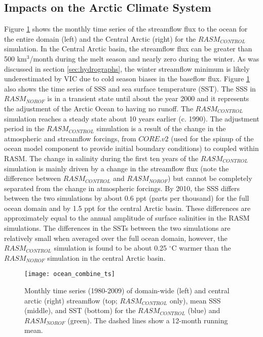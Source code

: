 \subsection{Impacts on the Arctic Climate System}
\label{sec:ocean}
Figure \ref{fig:ocean_timeseries} shows the monthly time series of the streamflow flux to the ocean for the entire domain (left) and the Central Arctic (right) for the $RASM_{CONTROL}$ simulation.
In the Central Arctic basin, the streamflow flux can be greater than 500 km$^3$/month during the melt season and nearly zero during the winter.
As was discussed in section \ref{sec:hydrographs}, the winter streamflow minimum is likely underestimated by VIC due to cold season biases in the baseflow flux.
Figure \ref{fig:ocean_timeseries} also shows the time series of SSS and sea surface temperature (SST).
The SSS in $RASM_{NOROF}$ is in a transient state until about the year 2000 and it represents the adjustment of the Arctic Ocean to having no runoff.
The $RASM_{CONTROL}$ simulation reaches a steady state about 10 years earlier (c. 1990).
The adjustment period in the $RASM_{CONTROL}$ simulation is a result of the change in the atmospheric and streamflow forcings, from $CORE.v2$ (used for the spinup of the ocean model component to provide initial boundary conditions) to coupled within RASM.
The change in salinity during the first ten years of the $RASM_{CONTROL}$ simulation is mainly driven by a change in the streamflow flux (note the difference between $RASM_{CONTROL}$ and $RASM_{NOROF}$) but cannot be completely separated from the change in atmospheric forcings.
By 2010, the SSS differs between the two simulations by about 0.6 ppt (parts per thousand) for the full ocean domain and by 1.5 ppt for the central Arctic basin.
These differences are approximately equal to the annual amplitude of surface salinities in the RASM simulations.
The differences in the SSTs between the two simulations are relatively small when averaged over the full ocean domain, however, the $RASM_{CONTROL}$ simulation is found to be about 0.25 $^{\circ}$C warmer than the $RASM_{NOROF}$ simulation in the central Arctic basin.

\begin{figure}
    \centering
    \texttt{[image: ocean\_combine\_ts]}
    \caption{Monthly time series (1980-2009) of domain-wide (left) and central arctic (right) streamflow (top; $RASM_{CONTROL}$ only), mean SSS (middle), and SST (bottom) for the $RASM_{CONTROL}$ (blue) and $RASM_{NOROF}$ (green). The dashed lines show a 12-month running mean.
    }
    \label{fig:ocean_timeseries}
\end{figure}

